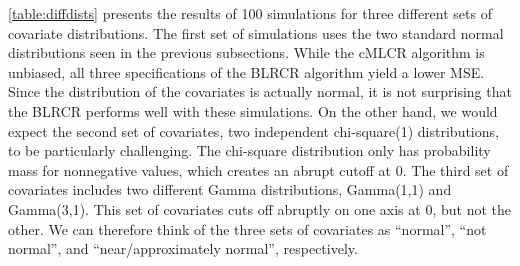 \documentclass[
  12pt,
]{article}
\begin{document}
\autoref{table:diffdists} presents the results of 100 simulations for
three different sets of covariate distributions. The first set of
simulations uses the two standard normal distributions seen in the
previous subsections. While the cMLCR algorithm is unbiased, all three
specifications of the BLRCR algorithm yield a lower MSE. Since the
distribution of the covariates is actually normal, it is not surprising
that the BLRCR performs well with these simulations. On the other hand,
we would expect the second set of covariates, two independent
chi-square(1) distributions, to be particularly challenging. The
chi-square distribution only has probability mass for nonnegative
values, which creates an abrupt cutoff at 0. The third set of covariates
includes two different Gamma distributions, Gamma(1,1) and Gamma(3,1).
This set of covariates cuts off abruptly on one axis at 0, but not the
other. We can therefore think of the three sets of covariates as
``normal'', ``not normal'', and ``near/approximately normal'',
respectively.
\end{document}
